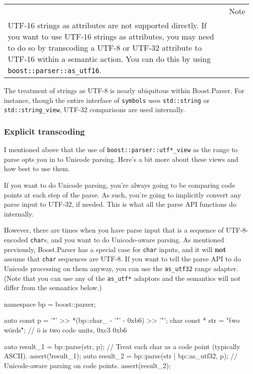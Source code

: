 \begin{longtable}[]{@{}
  >{\raggedright\arraybackslash}p{}
  >{\raggedright\arraybackslash}p{}@{}}
\toprule\noalign{}
\endhead
\bottomrule\noalign{}
\endlastfoot
\begin{minipage}[t]{\linewidth}\raggedright
\end{minipage} & Note \\
UTF-16 strings as attributes are not supported directly. If you want to use UTF-16 strings as attributes, you may need to do so by transcoding a UTF-8 or UTF-32 attribute to UTF-16 within a semantic action. You can do this by using \texttt{boost::parser::as\_utf16}. & \\
\end{longtable}

The treatment of strings as UTF-8 is nearly ubiquitous within Boost.Parser. For instance, though the entire interface of \texttt{symbols} uses \texttt{std::string} or \texttt{std::string\_view}, UTF-32 comparisons are used internally.

\subsubsection{Explicit transcoding}

I mentioned above that the use of \texttt{boost::parser::utf*\_view} as the range to parse opts you in to Unicode parsing. Here's a bit more about these views and how best to use them.

If you want to do Unicode parsing, you're always going to be comparing code points at each step of the parse. As such, you're going to implicitly convert any parse input to UTF-32, if needed. This is what all the parse API functions do internally.

However, there are times when you have parse input that is a sequence of UTF-8-encoded \texttt{char}s, and you want to do Unicode-aware parsing. As mentioned previously, Boost.Parser has a special case for \texttt{char} inputs, and it will \textbf{not} assume that \texttt{char} sequences are UTF-8. If you want to tell the parse API to do Unicode processing on them anyway, you can use the \texttt{as\_utf32} range adapter. (Note that you can use any of the \texttt{as\_utf*} adaptors and the semantics will not differ from the semantics below.)

\begin{code}
namespace bp = boost::parser;

auto const p = '"' >> *(bp::char_ - '"' - 0xb6) >> '"';
char const * str = "\"two wörds\""; // ö is two code units, 0xc3 0xb6

auto result_1 = bp::parse(str, p);                // Treat each char as a code point (typically ASCII).
assert(!result_1);
auto result_2 = bp::parse(str | bp::as_utf32, p); // Unicode-aware parsing on code points.
assert(result_2);
\end{code}

